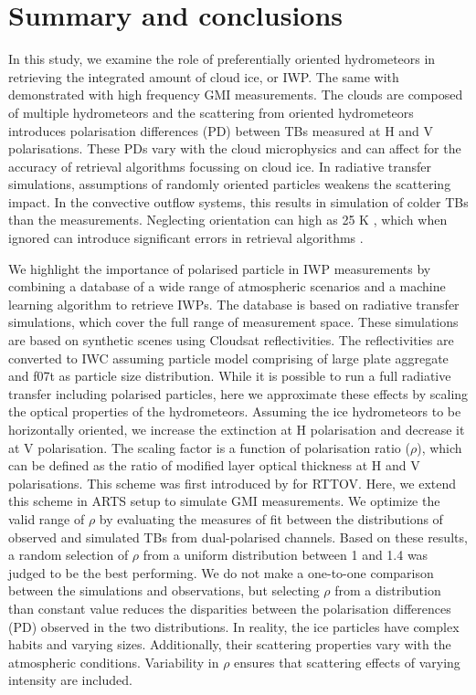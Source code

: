 \documentclass[amt, manuscript]{copernicus}
\begin{document}
\section{Summary and conclusions}
%
\label{sec:conclusions}

In this study, we examine the role of preferentially oriented hydrometeors in retrieving the integrated amount of cloud ice, or IWP. The same with demonstrated with high frequency GMI measurements. The clouds are composed of multiple hydrometeors and the scattering from oriented hydrometeors introduces polarisation differences (PD) between TBs measured at H and V polarisations. These PDs vary with the cloud microphysics and can affect for the accuracy of retrieval algorithms focussing on cloud ice. In radiative transfer simulations, assumptions of randomly oriented particles weakens the scattering impact. In the convective outflow systems, this results in simulation of colder TBs than the measurements. Neglecting orientation can  high as 25\,\,K , which when ignored can introduce significant errors in retrieval algorithms .

We highlight the importance of polarised particle in IWP measurements by combining a database of a wide range of atmospheric scenarios and a machine learning algorithm to retrieve IWPs. The database is based on radiative transfer simulations, which  cover the full range of measurement space. These simulations are based on synthetic scenes using Cloudsat reflectivities. The reflectivities are converted to IWC assuming particle model comprising of large plate aggregate and f07t as particle size distribution. While it is possible to run a full radiative transfer including polarised particles, here we approximate these effects by scaling the optical properties of the hydrometeors. Assuming the ice hydrometeors to be horizontally oriented, we increase the extinction at H polarisation and decrease it at V polarisation. The scaling factor is a function of polarisation ratio ($\rho$), which can be defined as the ratio of modified layer optical thickness at H  and V  polarisations. This scheme was first introduced by \citet{barlakas:intro:21} for RTTOV. Here, we extend this scheme in ARTS setup to simulate GMI measurements. We optimize the valid range of $\rho$ by evaluating the measures of fit between the distributions of observed and simulated TBs from dual-polarised channels. Based on these results, a random selection of $\rho$ from a uniform distribution between 1 and 1.4  was judged to be the best performing. We do not make a one-to-one comparison between the simulations and observations, but selecting $\rho$ from a distribution than constant value reduces the disparities between the polarisation differences (PD) observed in the two distributions. In reality, the ice particles have complex habits and varying sizes. Additionally, their scattering properties vary with the atmospheric conditions. Variability in $\rho$ ensures that scattering effects of varying intensity are included. 
\end{document}
